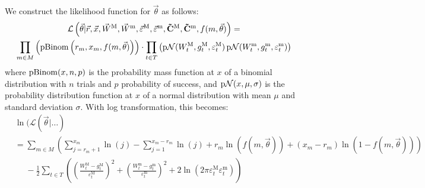 We construct the likelihood function for $\vec{\theta}$ as follows:
\begin{multline}
    \mathcal{L}\left(\vec{\theta} | \vec{r}, \vec{x},\vec{W}^\text{M}, \vec{W}^\text{m}, \vec{\varepsilon}^\text{M}, \vec{\varepsilon}^\text{m}, \mathbf{\tilde{C}^\text{M}}, \mathbf{\tilde{C}^\text{m}}, f(m,\vec{\theta})\right) = \\
    \prod_{m \in M}\left(\operatorname{pBinom}\left(r_m, x_m, f(m, \vec{\theta})\right)\right) \cdot \prod_{t \in T}\left(\operatorname{p\mathcal{N}}(W^\text{M}_t, g^\text{M}_t, \varepsilon^\text{M}_t) \operatorname{p\mathcal{N}}(W^\text{m}_t, g^\text{m}_t, \varepsilon^\text{m}_t)\right)
\end{multline}
where $\operatorname{pBinom}(x, n, p)$ is the probability mass function at $x$ of a binomial distribution with $n$ trials and $p$ probability of success, and $\operatorname{p\mathcal{N}}(x, \mu, \sigma)$ is the probability distribution function at $x$ of a normal distribution with mean $\mu$ and standard deviation $\sigma$. With log transformation, this becomes:
\begin{align}
    &\ln(\mathcal{L}(\vec\theta | \ldots) \nonumber \\
    &= \sum_{m \in M} \left( \sum_{j=r_m+1}^{x_m} \ln(j) - \sum_{j=1}^{x_m-r_m}\ln(j) + r_m\ln\left(f(m,\vec{\theta})\right) + (x_m-r_m)\ln\left(1-f(m,\vec{\theta})\right)\right) \nonumber \\
    &\phantom{=} - \frac{1}{2}\sum_{t \in T} \left( \left(\frac{W^\text{M}_t - g^\text{M}_t}{\varepsilon^\text{M}_t}\right)^2 + \left(\frac{W^\text{m}_t - g^\text{m}_t}{\varepsilon^\text{m}_t}\right)^2 + 2\ln(2\pi \varepsilon^\text{M}_t \varepsilon^\text{m}_t)\right)
\end{align}

